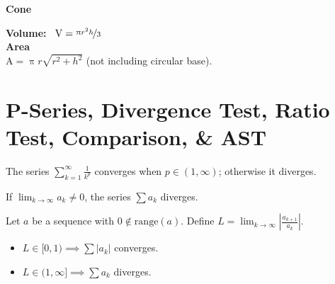 \documentclass[letterpaper,landscape,9pt,fleqn]{extarticle}
\newcommand{\range}{\mathrm{range}}
\begin{document}
\begin{multicols*}{2}
\noindent \textbf{Cone} \\
  \begin{minipage}[c]{0.25\textwidth}
  \end{minipage}
  \begin{minipage}[c]{0.25\textwidth}
  \noindent \textbf{Volume:} \,
  \(
     \mbox{V} = \nicefrac{\uppi r^2 h}{3}
  \) \\ 
  
\noindent \textbf{Area} \\
\(
   \mbox{A} =  \uppi r   \sqrt{r^2+h^2}
\)  (not including circular base).
\end{minipage}




\section*{P-Series, Divergence Test, Ratio Test, Comparison, \& AST}

\vspace{0.25in}
\begin{minipage}[c]{0.5\textwidth}
The series \(\sum_{k=1}^\infty \frac{1}{k^p}\) converges when $p \in (1,\infty)$;
otherwise it diverges.


If $\lim_{k \to \infty} a_k  \neq 0$, the series $\sum a_k$ diverges.


Let $a$ be a sequence with $0 \notin \range(a)$. Define 
$L = \lim_{k \to \infty} \left| \frac{a_{k+1}}{a_k} \right|$.
\begin{itemize}[noitemsep]
\item $L \in [0,1) \implies \sum |a_k| $ converges.
\item $L \in (1,\infty] \implies \sum a_k $ diverges.
\end{itemize}


\end{minipage}
\end{multicols*}
\end{document}
